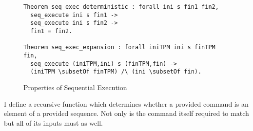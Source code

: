 \begin{figure}[h]
\begin{lstlisting}[language=Coq]
Theorem seq_exec_deterministic : forall ini s fin1 fin2,
  seq_execute ini s fin1 ->
  seq_execute ini s fin2 ->
  fin1 = fin2.

Theorem seq_exec_expansion : forall iniTPM ini s finTPM fin,
  seq_execute (iniTPM,ini) s (finTPM,fin) ->
  (iniTPM \subsetOf finTPM) /\ (ini \subsetOf fin).
\end{lstlisting}
\caption{Properties of Sequential Execution}
\end{figure}

I define a recursive function which determines whether a provided command is an element of a provided sequence. Not only is the command itself required to match but all of its inputs must as well.